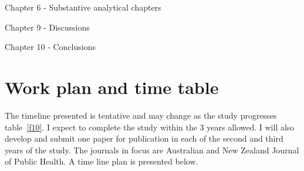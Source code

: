 Chapter 6 - Substantive analytical chapters 

Chapter 9 - Discussions 

Chapter 10 - Conclusions

\section{Work plan and time table}

The timeline presented is tentative and may change as the study progresses table~\ref{f10}. I expect to complete the study within the 3 years allowed. I will also develop and submit one paper for publication in each of the second and third years of the study. The journals in focus are Australian and New Zealand Journal of Public Health. A time line plan is presented below.

